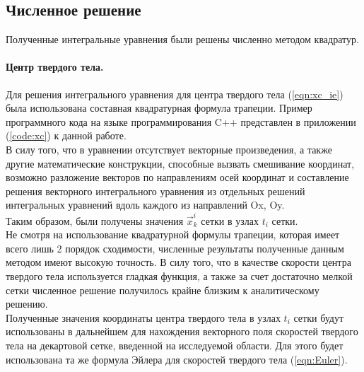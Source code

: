 \documentclass[12pt,a4paper]{article}
\begin{document}
\subsection{Численное решение}
Полученные интегральные уравнения были решены численно методом квадратур.
\paragraph{Центр твердого тела.}
Для решения интегрального уравнения для центра твердого тела (\ref{eqn:xc_ie}) была использована составная квадратурная формула трапеции. Пример программного кода на языке программирования C++ представлен в приложении (\ref{code:xc}) к данной работе.\\
В силу того, что в уравнении отсутствует векторные произведения, а также другие математические конструкции, способные вызвать смешивание координат, возможно разложение векторов по направлениям осей координат и составление решения векторного интегрального уравнения из отдельных решений интегральных уравнений вдоль каждого из направлений Ox, Oy.\\
Таким образом, были получены значения $\overrightarrow{x}_k^i$ сетки в узлах $t_i$ сетки.\\
Не смотря на использование квадратурной формулы трапеции, которая имеет всего лишь 2 порядок сходимости, численные результаты полученные данным методом имеют высокую точность. В силу того, что в качестве скорости центра твердого тела используется гладкая функция, а также за счет достаточно мелкой сетки численное решение получилось крайне близким к аналитическому решению.\\
Полученные значения координаты центра твердого тела в узлах $t_i$ сетки будут использованы в дальнейшем для нахождения векторного поля скоростей твердого тела на декартовой сетке, введенной на исследуемой области. Для этого будет использована та же формула Эйлера для скоростей твердого тела (\ref{eqn:Euler}).
\end{document}
